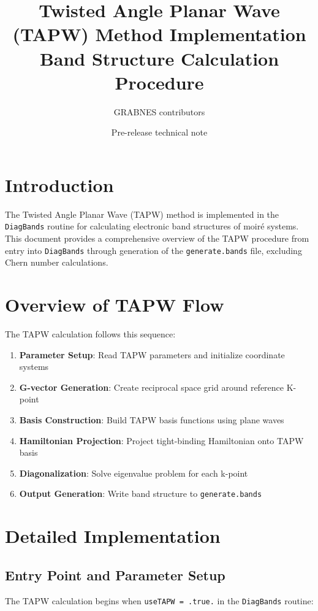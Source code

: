 \documentclass[11pt,a4paper]{article}
\title{Twisted Angle Planar Wave (TAPW) Method Implementation\\
Band Structure Calculation Procedure}
\author{GRABNES contributors}
\date{Pre-release technical note}
\begin{document}
\maketitle

\section{Introduction}

The Twisted Angle Planar Wave (TAPW) method is implemented in the \texttt{DiagBands} routine for calculating electronic band structures of moiré systems. This document provides a comprehensive overview of the TAPW procedure from entry into \texttt{DiagBands} through generation of the \texttt{generate.bands} file, excluding Chern number calculations.

\section{Overview of TAPW Flow}

The TAPW calculation follows this sequence:
\begin{enumerate}
    \item \textbf{Parameter Setup}: Read TAPW parameters and initialize coordinate systems
    \item \textbf{G-vector Generation}: Create reciprocal space grid around reference K-point
    \item \textbf{Basis Construction}: Build TAPW basis functions using plane waves
    \item \textbf{Hamiltonian Projection}: Project tight-binding Hamiltonian onto TAPW basis
    \item \textbf{Diagonalization}: Solve eigenvalue problem for each k-point
    \item \textbf{Output Generation}: Write band structure to \texttt{generate.bands}
\end{enumerate}

\section{Detailed Implementation}

\subsection{Entry Point and Parameter Setup}

The TAPW calculation begins when \texttt{useTAPW = .true.} in the \texttt{DiagBands} routine:
\end{document}
